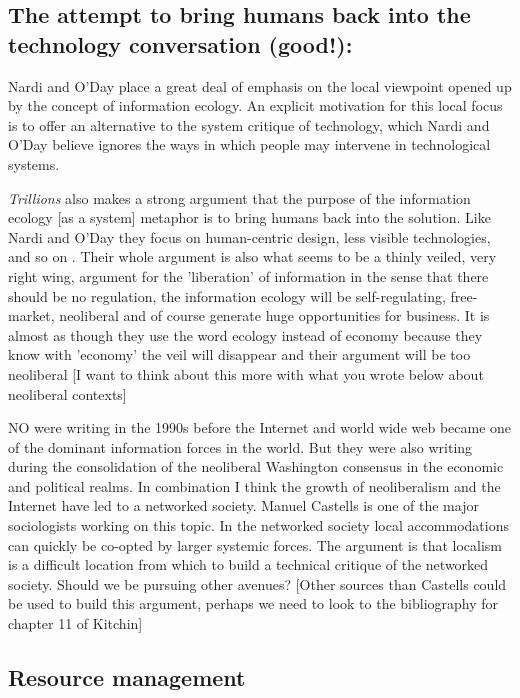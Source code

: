 \subsection{The attempt to bring humans back into the technology conversation (good!):}

Nardi and O'Day place a great deal of emphasis on the local viewpoint opened up by the concept of information ecology. An explicit motivation for this local focus is to offer an alternative to the system critique of technology, which Nardi and O'Day believe ignores the ways in which people may intervene in technological systems.

\textit{Trillions} also makes a strong argument that the purpose of the information ecology [as a system] metaphor is to bring humans back into the solution. Like Nardi and O'Day they focus on human-centric design, less visible technologies, and so on \citep{lucas_2012}. Their whole argument is also what seems to be a thinly veiled, very right wing, argument for the 'liberation' of information in the sense that there should be no regulation, the information ecology will be self-regulating, free-market, neoliberal and of course generate huge opportunities for business. It is almost as though they use the word ecology instead of economy because they know with 'economy' the veil will disappear and their argument will be too neoliberal [I want to think about this more with what you wrote below about neoliberal contexts]

NO were writing in the 1990s before the Internet and world wide web became one of the dominant information forces in the world. But they were also writing during the consolidation of the neoliberal Washington consensus in the economic and political realms. In combination I think the growth of neoliberalism and the Internet have led to a networked society. Manuel Castells is one of the major sociologists working on this topic. In the networked society local accommodations can quickly be co-opted by larger systemic forces. The argument is that localism is a difficult location from which to build a technical critique of the networked society. Should we be pursuing other avenues? [Other sources than Castells could be used to build this argument, perhaps we need to look to the bibliography for chapter 11 of Kitchin]

\subsection{Resource management}


